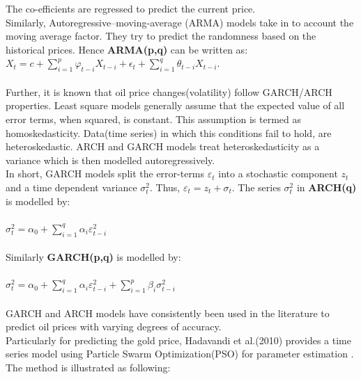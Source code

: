 \documentclass[runningheads]{llncs}
\begin{document}
\noindent The co-efficients are regressed to predict the current price. \\

\noindent Similarly, Autoregressive–moving-average (ARMA) models take in to account the moving average factor. They try to predict the randomness based on the historical prices.  Hence \textbf{ARMA(p,q)} can be written as:\\

$ X_{t} = c + \sum\limits_{i=1}^p \varphi_{t-i}X_{t-i} + \epsilon_{t} + \sum\limits_{i=1}^q \theta_{t-i}X_{t-i}$.\\
\\

\noindent Further, it is known that oil price changes(volatility) follow GARCH/ARCH properties. Least square models generally assume that the expected value of all error terms, when squared, is constant. This assumption is termed as homoskedasticity. Data(time series) in which this conditions fail to hold, are heteroskedastic. ARCH and GARCH models treat heteroskedasticity as a variance which is then modelled autoregressively.\cite{engle}\\

\noindent In short, GARCH models split the error-terms $\varepsilon_t$ into a stochastic component $z_{t}$ and a time dependent variance $\sigma^2_{t}$. Thus, $ \varepsilon_t = z_{t} + \sigma_{t}$. The series $\sigma^2_{t}$ in \textbf{ARCH(q)} is modelled by:\\\\

$\sigma^2_{t} = \alpha_{0} + \sum\limits_{i=1}^q \alpha_{i}\varepsilon_{t-i}^2 $\\\\

\noindent Similarly \textbf{GARCH(p,q)} is modelled by:\\\\

$\sigma^2_{t} = \alpha_{0} + \sum\limits_{i=1}^q \alpha_{i}\varepsilon_{t-i}^2 + \sum\limits_{i=1}^p \beta_{i}\sigma_{t-i}^2 $\\\\

\noindent GARCH and ARCH models have consistently been used in the literature to predict oil prices with varying degrees of accuracy. \\

\noindent Particularly for predicting the gold price, Hadavandi et al.(2010) provides a time series model using Particle Swarm Optimization(PSO) for parameter estimation \cite{gold-pso}. The method is illustrated as following: \\
\end{document}
